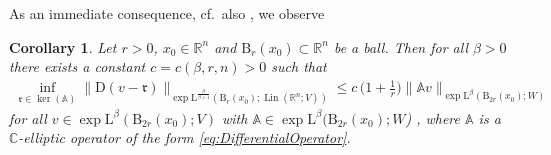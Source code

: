 \documentclass[a4paper,10pt,reqno,oneside]{amsart}
\numberwithin{equation}{section}
\newcommand{\R}{\mathbb R}
\newcommand{\C}{\mathbb C}
\newcommand{\ball}{\mathrm{B}}
\newcommand{\Aop}{\mathbb{A}}
\newcommand{\sobo}{\operatorname{W}}
\newcommand{\D}{\mathrm{D}}
\DeclareMathOperator{\Lin}{Lin}
\newcommand{\rfrak}{\mathfrak{r}}
\renewcommand{\L}{\mathrm{L}}
\newtheorem{cor}[thm]{Corollary}
\begin{document}
\pagebreak \noindent As an immediate consequence, cf.~also \cite [Example 3.11]{Cianchi}, we observe 
\begin{cor}\label{cor:KornType_Orlicz_C_Elliptic}
	Let $r>0$, $x_0\in\R^n$ and $\ball_r(x_0)\subset\R^n$ be a ball. Then for all $\beta>0$ there exists a constant $c=c(\beta,r,n)>0$ such that
	\begin{align}\label{eq:exponentialKorn_type}
		\inf_{\rfrak\in\ker(\Aop)} \|\D (v-\rfrak)\|_{\exp\L^{\frac{\beta}{\beta+1}}(\ball_r(x_0);\Lin(\R^n;V))}
		\leq c\,\bigg(1+\frac{1}{r}\bigg)\|\Aop v \|_{\exp\L^{\beta}(\ball_{2r}(x_0);W)}
	\end{align}
	for all $v\in\exp\L^\beta(\ball_{2r}(x_0);V)$ with $\Aop \in \exp\L^\beta(\ball_{2r}(x_0);W$) %
	, where $\Aop$ is a $\C$-elliptic operator of the form \eqref{eq:DifferentialOperator}.
\end{cor}
\end{document}
